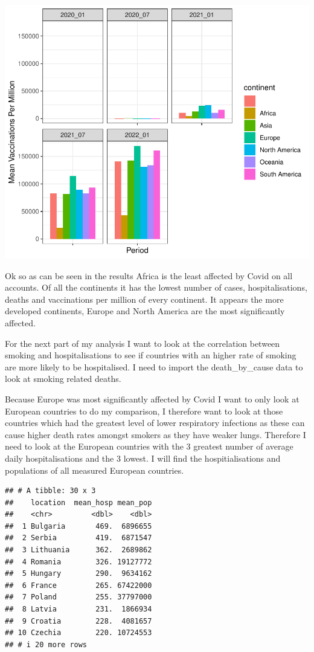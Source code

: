 \documentclass[11pt,preprint, authoryear]{elsarticle}
\numberwithin{equation}{section}
\numberwithin{figure}{section}
\numberwithin{table}{section}
\begin{document}
\includegraphics{Question_1_files/figure-latex/unnamed-chunk-3-4.pdf}

Ok so as can be seen in the results Africa is the least affected by
Covid on all accounts. Of all the continents it has the lowest number of
cases, hospitalisations, deaths and vaccinations per million of every
continent. It appears the more developed continents, Europe and North
America are the most significantly affected.

For the next part of my analysis I want to look at the correlation
between smoking and hospitalisations to see if countries with an higher
rate of smoking are more likely to be hospitalised. I need to import the
death\_by\_cause data to look at smoking related deaths.

Because Europe was most significantly affected by Covid I want to only
look at European countries to do my comparison, I therefore want to look
at those countries which had the greatest level of lower respiratory
infections as these can cause higher death rates amongst smokers as they
have weaker lungs. Therefore I need to look at the European countries
with the 3 greatest number of average daily hospitalisations and the 3
lowest. I will find the hospitialisations and populations of all
measured European countries.

\begin{verbatim}
## # A tibble: 30 x 3
##    location  mean_hosp mean_pop
##    <chr>         <dbl>    <dbl>
##  1 Bulgaria       469.  6896655
##  2 Serbia         419.  6871547
##  3 Lithuania      362.  2689862
##  4 Romania        326. 19127772
##  5 Hungary        290.  9634162
##  6 France         265. 67422000
##  7 Poland         255. 37797000
##  8 Latvia         231.  1866934
##  9 Croatia        228.  4081657
## 10 Czechia        220. 10724553
## # i 20 more rows
\end{verbatim}
\end{document}
